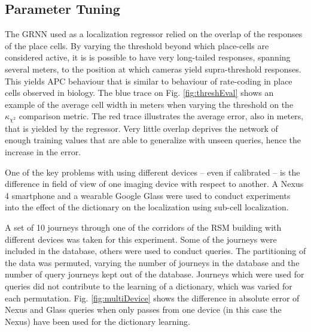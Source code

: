 \subsection{Parameter Tuning}

%		
%
%		

The GRNN used as a localization regressor relied on the overlap of the responses of the place cells. By varying the threshold beyond which place-cells are considered active, it is is possible to have very long-tailed responses, spanning several meters, to the position at which cameras yield supra-threshold responses.  This yields APC behaviour that is similar to behaviour of rate-coding in place cells observed in biology. The blue trace on Fig. \ref{fig:threshEval} shows an example of the average cell width in meters when varying the threshold on the $\kappa_{\chi^2}$ comparison metric. The red trace illustrates the average error, also in meters, that is yielded by the regressor. Very little overlap deprives the network of enough training values that are able to generalize with unseen queries, hence the increase in the error.

One of the key problems with using different devices -- even if calibrated -- is the difference in field of view of one imaging device with respect to another.  A Nexus 4 smartphone and a wearable Google Glass were used to conduct experiments into the effect of the dictionary  on the localization using sub-cell localization. 

A set of 10 journeys through one of the corridors of the RSM building with different devices was taken for this experiment.  Some of the journeys were included in the database, others were used to conduct queries.  The partitioning of the data was permuted, varying the number of journeys in the database and the number of query journeys kept out of the database.  Journeys which were used for queries did not contribute to the learning of a dictionary, which was varied for each permutation. Fig. \ref{fig:multiDevice} shows the difference in absolute error of Nexus and Glass queries when only passes from one device (in this case the Nexus) have been used for the dictionary learning. 



